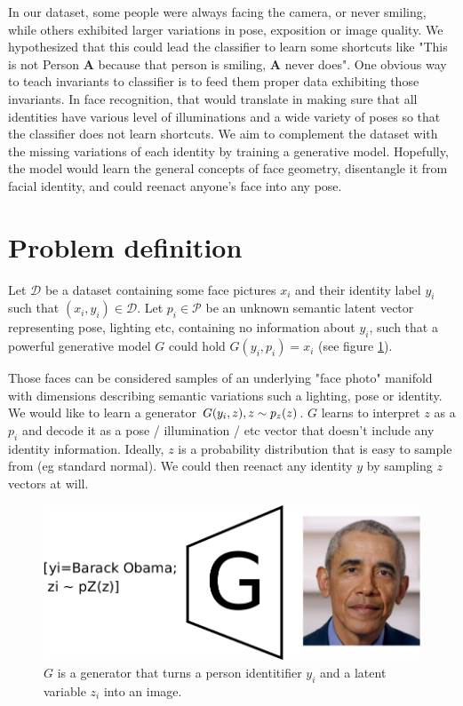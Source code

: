 In our dataset, some people were always facing the camera, or never smiling, while others exhibited larger variations in pose, exposition or image quality. We hypothesized that this could lead the classifier to learn some shortcuts like "This is not Person \textbf{A} because that person is smiling, \textbf{A} never does". One obvious way to teach invariants to classifier is to feed them proper data exhibiting those invariants. In face recognition, that would translate in making sure that all identities have various level of illuminations and a wide variety of poses so that the classifier does not learn shortcuts. We aim to complement the dataset with the missing variations of each identity by training a generative model. Hopefully, the model would learn the general concepts of face geometry, disentangle it from facial identity, and could reenact anyone's face into any pose.

\section{Problem definition}

Let $\mathcal{D}$ be a dataset containing some face pictures $x_i$ and their identity label $y_i$ such that $(x_i, y_i) \in\mathcal{D}$. Let $p_i \in \mathcal{P}$ be an unknown semantic latent vector representing pose, lighting etc, containing no information about $y_i$, such that a powerful generative model $G$ could hold $G(y_i, p_i) = x_i$ (see figure \ref{fig:G_specs}).

Those faces can be considered samples of an underlying "face photo" manifold with dimensions describing semantic variations such a lighting, pose or identity. We would like to learn a generator $G(y_i, z), z \sim p_z(z)$. $G$ learns to interpret $z$ as a $p_i$ and decode it as a pose / illumination / etc vector that doesn't include any identity information. Ideally, $z$ is a probability distribution that is easy to sample from (eg standard normal). We could then reenact any identity $y$ by sampling $z$ vectors at will.

\begin{figure}[ht]
    \centering
    \includegraphics[scale=0.5]{60-files/GANVAE-1-1}
    \caption{$G$ is a generator that turns a person identitifier $y_i$ and a latent variable $z_i$ into an image.}
    \label{fig:G_specs}
\end{figure}

